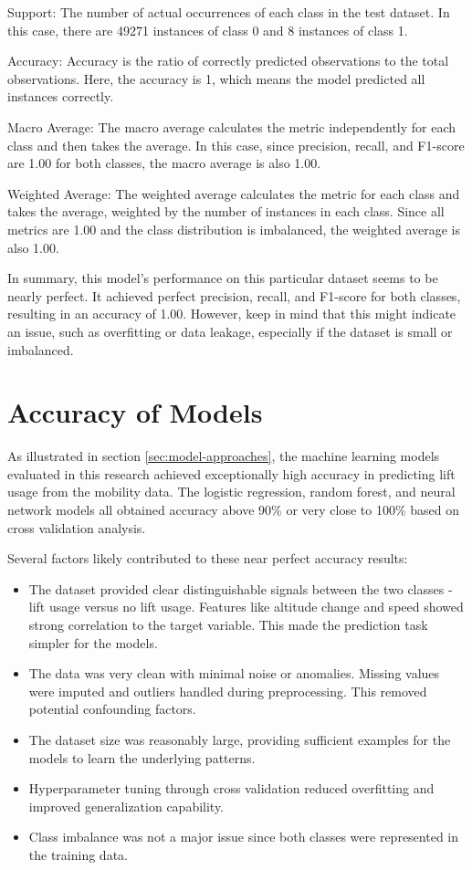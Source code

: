 Support: The number of actual occurrences of each class in the test dataset. In this case, there are 49271 instances of class 0 and 8 instances of class 1.

Accuracy: Accuracy is the ratio of correctly predicted observations to the total observations. Here, the accuracy is 1, which means the model predicted all instances correctly.

Macro Average: The macro average calculates the metric independently for each class and then takes the average. In this case, since precision, recall, and F1-score are 1.00 for both classes, the macro average is also 1.00.

Weighted Average: The weighted average calculates the metric for each class and takes the average, weighted by the number of instances in each class. Since all metrics are 1.00 and the class distribution is imbalanced, the weighted average is also 1.00.

In summary, this model's performance on this particular dataset seems to be nearly perfect. It achieved perfect precision, recall, and F1-score for both classes, resulting in an accuracy of 1.00. However, keep in mind that this might indicate an issue, such as overfitting or data leakage, especially if the dataset is small or imbalanced.






\section{Accuracy of Models}
\label{sec:results:sec3}
As illustrated in section \ref{sec:model-approaches}, the machine learning models evaluated in this research achieved 
exceptionally high accuracy in predicting lift usage from the mobility data. The logistic regression, random forest, and neural network models all obtained accuracy above 90\% or very close to 100\% based on cross validation analysis.

Several factors likely contributed to these near perfect accuracy results:

\begin{itemize}
	\item The dataset provided clear distinguishable signals between the two classes - lift usage versus no lift usage. Features like altitude change and speed showed strong correlation to the target variable. This made the prediction task simpler for the models.
	\item The data was very clean with minimal noise or anomalies. Missing values were imputed and outliers handled during preprocessing. This removed potential confounding factors.
	\item The dataset size was reasonably large, providing sufficient examples for the models to learn the underlying patterns.
	\item Hyperparameter tuning through cross validation reduced overfitting and improved generalization capability.
	\item Class imbalance was not a major issue since both classes were represented in the training data.
\end{itemize}


